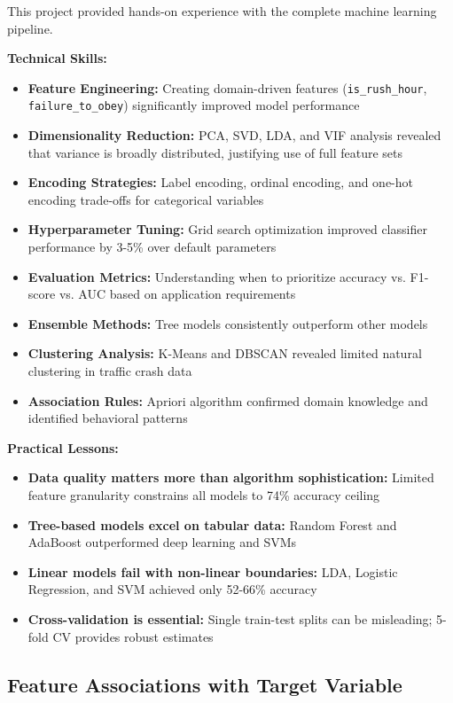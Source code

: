 \documentclass[stu,12pt,floatsintext]{apa7}
\begin{document}
This project provided hands-on experience with the complete machine learning pipeline. 

\textbf{Technical Skills:}
\begin{itemize}
    \item \textbf{Feature Engineering:} Creating domain-driven features (\texttt{is\_rush\_hour}, \texttt{failure\_to\_obey}) significantly improved model performance
    \item \textbf{Dimensionality Reduction:} PCA, SVD, LDA, and VIF analysis revealed that variance is broadly distributed, justifying use of full feature sets
    \item \textbf{Encoding Strategies:} Label encoding, ordinal encoding, and one-hot encoding trade-offs for categorical variables
    \item \textbf{Hyperparameter Tuning:} Grid search optimization improved classifier performance by 3-5\% over default parameters
    \item \textbf{Evaluation Metrics:} Understanding when to prioritize accuracy vs. F1-score vs. AUC based on application requirements
    \item \textbf{Ensemble Methods:} Tree models consistently outperform other models
    \item \textbf{Clustering Analysis:} K-Means and DBSCAN revealed limited natural clustering in traffic crash data
    \item \textbf{Association Rules:} Apriori algorithm confirmed domain knowledge and identified behavioral patterns
\end{itemize}

\textbf{Practical Lessons:}
\begin{itemize}
    \item \textbf{Data quality matters more than algorithm sophistication:} Limited feature granularity constrains all models to 74\% accuracy ceiling
    \item \textbf{Tree-based models excel on tabular data:} Random Forest and AdaBoost outperformed deep learning and SVMs
    \item \textbf{Linear models fail with non-linear boundaries:} LDA, Logistic Regression, and SVM achieved only 52-66\% accuracy
    \item \textbf{Cross-validation is essential:} Single train-test splits can be misleading; 5-fold CV provides robust estimates
\end{itemize}

\subsection{Feature Associations with Target Variable}
\end{document}
